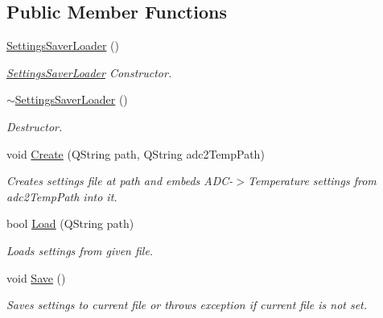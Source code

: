 \subsection*{Public Member Functions}
\begin{DoxyCompactItemize}
\item 
\mbox{\label{class_settings_saver_loader_a735862a6c6797a2faae92959d15ea531}} 
\hyperlink{class_settings_saver_loader_a735862a6c6797a2faae92959d15ea531}{Settings\+Saver\+Loader} ()
\begin{DoxyCompactList}\small\item\em \hyperlink{class_settings_saver_loader}{Settings\+Saver\+Loader} Constructor. \end{DoxyCompactList}\item 
\mbox{\label{class_settings_saver_loader_ad71f52898b7cfe1036351cce23400d78}} 
\hyperlink{class_settings_saver_loader_ad71f52898b7cfe1036351cce23400d78}{$\sim$\+Settings\+Saver\+Loader} ()
\begin{DoxyCompactList}\small\item\em Destructor. \end{DoxyCompactList}\item 
void \hyperlink{class_settings_saver_loader_a23524241e3edea7f26b72807c0090bdc}{Create} (Q\+String path, Q\+String adc2\+Temp\+Path)
\begin{DoxyCompactList}\small\item\em Creates settings file at path and embeds A\+D\+C-\/$>$Temperature settings from adc2\+Temp\+Path into it. \end{DoxyCompactList}\item 
bool \hyperlink{class_settings_saver_loader_aaf225d7d568ce33f6350d886bb40312a}{Load} (Q\+String path)
\begin{DoxyCompactList}\small\item\em Loads settings from given file. \end{DoxyCompactList}\item 
\mbox{\label{class_settings_saver_loader_a76f49378c54746013a5767dd6b348a33}} 
void \hyperlink{class_settings_saver_loader_a76f49378c54746013a5767dd6b348a33}{Save} ()
\begin{DoxyCompactList}\small\item\em Saves settings to current file or throws exception if current file is not set. \end{DoxyCompactList}\item 

\end{DoxyCompactItemize}
